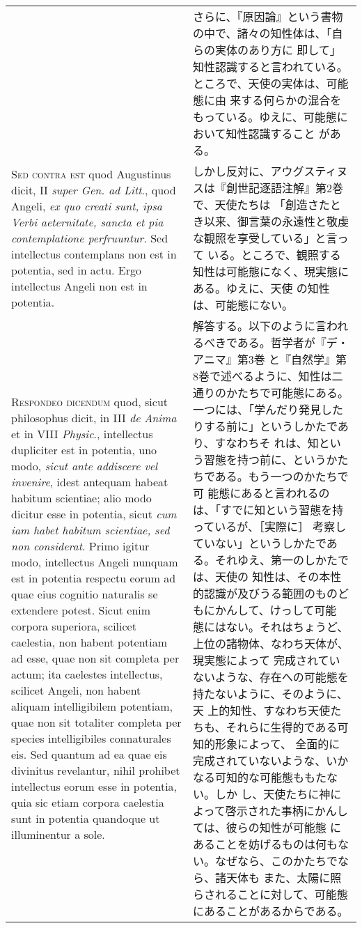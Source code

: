 \documentclass[10pt]{jsarticle} %
\begin{document}
\begin{longtable}{p{21em}p{21em}}
&


さらに、『原因論』という書物の中で、諸々の知性体は、「自らの実体のあり方に
即して」知性認識すると言われている。ところで、天使の実体は、可能態に由
来する何らかの混合をもっている。ゆえに、可能態において知性認識すること
がある。

\\


{\scshape Sed contra est} quod Augustinus dicit, II
{\itshape super Gen. ad Litt}., quod Angeli, {\itshape ex quo creati sunt, ipsa Verbi
aeternitate, sancta et pia contemplatione perfruuntur}. Sed intellectus
contemplans non est in potentia, sed in actu. Ergo intellectus Angeli
non est in potentia.


&

しかし反対に、アウグスティヌスは『創世記逐語注解』第2巻で、天使たちは
「創造さたとき以来、御言葉の永遠性と敬虔な観照を享受している」と言って
いる。ところで、観照する知性は可能態になく、現実態にある。ゆえに、天使
の知性は、可能態にない。


\\


{\scshape Respondeo dicendum} quod, sicut philosophus
dicit, in III {\itshape de Anima} et in VIII {\itshape Physic}., intellectus dupliciter est in
potentia, uno modo, {\itshape sicut ante addiscere vel invenire}, idest antequam
habeat habitum scientiae; alio modo dicitur esse in potentia, sicut {\itshape cum
iam habet habitum scientiae, sed non considerat}. Primo igitur modo,
intellectus Angeli nunquam est in potentia respectu eorum ad quae eius
cognitio naturalis se extendere potest. Sicut enim corpora superiora,
scilicet caelestia, non habent potentiam ad esse, quae non sit completa
per actum; ita caelestes intellectus, scilicet Angeli, non habent
aliquam intelligibilem potentiam, quae non sit totaliter completa per
species intelligibiles connaturales eis. 
Sed quantum ad ea quae eis
divinitus revelantur, nihil prohibet intellectus eorum esse in potentia,
quia sic etiam corpora caelestia sunt in potentia quandoque ut
illuminentur a sole.
&

解答する。以下のように言われるべきである。哲学者が『デ・アニマ』第3巻
と『自然学』第8巻で述べるように、知性は二通りのかたちで可能態にある。
一つには、「学んだり発見したりする前に」というしかたであり、すなわちそ
れは、知という習態を持つ前に、というかたちである。もう一つのかたちで可
能態にあると言われるのは、「すでに知という習態を持っているが、［実際に］
考察していない」というしかたである。それゆえ、第一のしかたでは、天使の
知性は、その本性的認識が及びうる範囲のものどもにかんして、けっして可能
態にはない。それはちょうど、上位の諸物体、なわち天体が、現実態によって
完成されていないような、存在への可能態を持たないように、そのように、天
上的知性、すなわち天使たちも、それらに生得的である可知的形象によって、
全面的に完成されていないような、いかなる可知的な可能態ももたない。しか
し、天使たちに神によって啓示された事柄にかんしては、彼らの知性が可能態
にあることを妨げるものは何もない。なぜなら、このかたちでなら、諸天体も
また、太陽に照らされることに対して、可能態にあることがあるからである。




\end{longtable}
\end{document}
